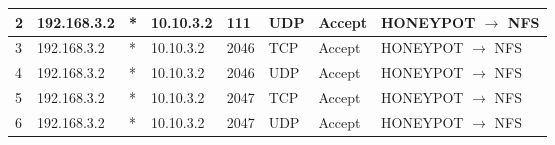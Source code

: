 \documentclass[a4paper, 11pt, oneside]{article}
\begin{document}
\begin{table}[H]
{\begin{tabular}{|llllllll|}
\multicolumn{1}{|l|}{2}           & \multicolumn{1}{l|}{192.168.3.2}                                                  & \multicolumn{1}{l|}{*}                                                              & \multicolumn{1}{l|}{10.10.3.2}                                                        & \multicolumn{1}{l|}{111}                                                                 & \multicolumn{1}{l|}{UDP}               & \multicolumn{1}{l|}{Accept}          & HONEYPOT $\rightarrow$ NFS             \\ \hline
\multicolumn{1}{|l|}{3}           & \multicolumn{1}{l|}{192.168.3.2}                                                  & \multicolumn{1}{l|}{*}                                                              & \multicolumn{1}{l|}{10.10.3.2}                                                        & \multicolumn{1}{l|}{2046}                                                                & \multicolumn{1}{l|}{TCP}               & \multicolumn{1}{l|}{Accept}          & HONEYPOT $\rightarrow$ NFS             \\ \hline
\multicolumn{1}{|l|}{4}           & \multicolumn{1}{l|}{192.168.3.2}                                                  & \multicolumn{1}{l|}{*}                                                              & \multicolumn{1}{l|}{10.10.3.2}                                                        & \multicolumn{1}{l|}{2046}                                                                & \multicolumn{1}{l|}{UDP}               & \multicolumn{1}{l|}{Accept}          & HONEYPOT $\rightarrow$ NFS             \\ \hline
\multicolumn{1}{|l|}{5}           & \multicolumn{1}{l|}{192.168.3.2}                                                  & \multicolumn{1}{l|}{*}                                                              & \multicolumn{1}{l|}{10.10.3.2}                                                        & \multicolumn{1}{l|}{2047}                                                                & \multicolumn{1}{l|}{TCP}               & \multicolumn{1}{l|}{Accept}          & HONEYPOT $\rightarrow$ NFS             \\ \hline
\multicolumn{1}{|l|}{6}           & \multicolumn{1}{l|}{192.168.3.2}                                                  & \multicolumn{1}{l|}{*}                                                              & \multicolumn{1}{l|}{10.10.3.2}                                                        & \multicolumn{1}{l|}{2047}                                                                & \multicolumn{1}{l|}{UDP}               & \multicolumn{1}{l|}{Accept}          & HONEYPOT $\rightarrow$ NFS             \\ \hline

\end{tabular}}
\end{table}
\end{document}
